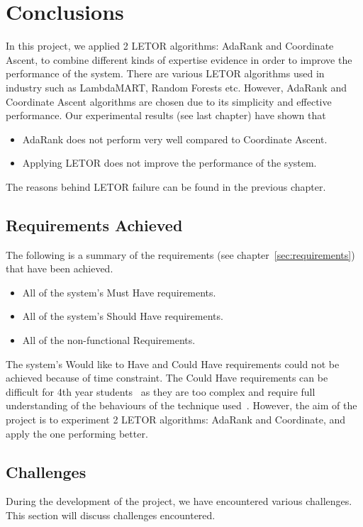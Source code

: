 
\chapter{Conclusions}
In this project, we applied 2 LETOR algorithms: AdaRank and Coordinate Ascent, to combine different kinds of expertise evidence in order 
to improve the performance of the system. There are various LETOR algorithms used in industry such as LambdaMART, Random Forests etc. 
However, AdaRank and Coordinate Ascent algorithms are chosen due to its simplicity and effective performance. Our experimental results (see last chapter) have shown that
\begin{itemize}
 \item AdaRank does not perform very well compared to Coordinate Ascent.
 \item Applying LETOR does not improve the performance of the system.
\end{itemize}

\noindent The reasons behind LETOR failure can be found in the previous chapter.

\section{Requirements Achieved}
The following is a summary of the requirements (see chapter~\ref{sec:requirements}) that have been achieved.
\begin{itemize}
 \item All of the system's Must Have requirements.
 \item All of the system's Should Have requirements.
 \item All of the non-functional Requirements.
\end{itemize}
The system's Would like to Have and Could Have requirements could not be achieved because of time constraint.
The Could Have requirements can be difficult for 4th year students~\cite{craig} as they are too complex and require full understanding of the 
behaviours of the technique used~\cite{craig}.
However, the aim of the project is to experiment 2 LETOR algorithms: AdaRank and Coordinate, and apply the one performing better.

\section{Challenges}\label{sec:challenges}
During the development of the project, we have encountered various challenges. This section will discuss challenges encountered.


